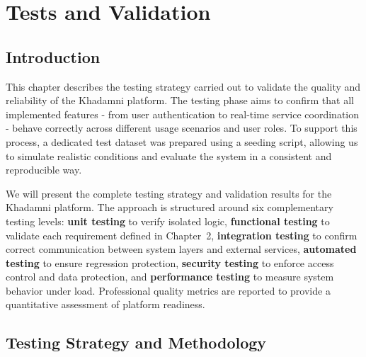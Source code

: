 \chapter{Tests and Validation}
\label{chap:testing}

\section{Introduction}

This chapter describes the testing strategy carried out to validate the quality and reliability of the Khadamni platform. The testing phase aims to confirm that all implemented features - from user authentication to real-time service coordination - behave correctly across different usage scenarios and user roles. To support this process, a dedicated test dataset was prepared using a seeding script, allowing us to simulate realistic conditions and evaluate the system in a consistent and reproducible way.

We will present the complete testing strategy and validation results for the Khadamni platform. The approach is structured around six complementary testing levels: \textbf{unit testing} to verify isolated logic, \textbf{functional testing} to validate each requirement defined in Chapter~2, \textbf{integration testing} to confirm correct communication between system layers and external services, \textbf{automated testing} to ensure regression protection, \textbf{security testing} to enforce access control and data protection, and \textbf{performance testing} to measure system behavior under load. Professional quality metrics are reported to provide a quantitative assessment of platform readiness.

\section{Testing Strategy and Methodology}


